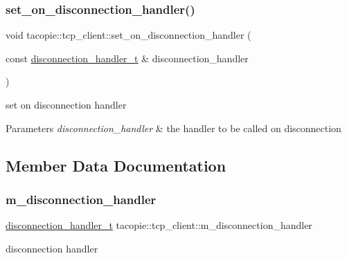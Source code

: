 \subsubsection{\texorpdfstring{set\+\_\+on\+\_\+disconnection\+\_\+handler()}{set\_on\_disconnection\_handler()}}
{\footnotesize\ttfamily void tacopie\+::tcp\+\_\+client\+::set\+\_\+on\+\_\+disconnection\+\_\+handler (\begin{DoxyParamCaption}\item[{const \hyperlink{classtacopie_1_1tcp__client_aca5df52e5ee6fa673cf212532ada1453}{disconnection\+\_\+handler\+\_\+t} \&}]{disconnection\+\_\+handler }\end{DoxyParamCaption})}

set on disconnection handler


\begin{DoxyParams}{Parameters}
{\em disconnection\+\_\+handler} & the handler to be called on disconnection \\
\hline
\end{DoxyParams}


\subsection{Member Data Documentation}
\mbox{\label{classtacopie_1_1tcp__client_a5ee7259fe6a8258515162e1ed516de20}} 
\subsubsection{\texorpdfstring{m\+\_\+disconnection\+\_\+handler}{m\_disconnection\_handler}}
{\footnotesize\ttfamily \hyperlink{classtacopie_1_1tcp__client_aca5df52e5ee6fa673cf212532ada1453}{disconnection\+\_\+handler\+\_\+t} tacopie\+::tcp\+\_\+client\+::m\+\_\+disconnection\+\_\+handler\hspace{0.3cm}{\ttfamily [private]}}

disconnection handler \mbox{\label{classtacopie_1_1tcp__client_a2a5e4ae0f4fbcd375df4cb1f8070b993}} 
